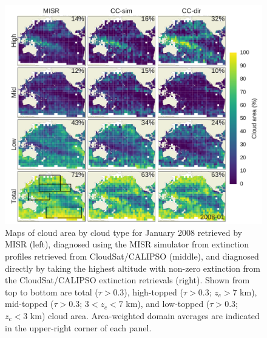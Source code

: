 \begin{figure}[htbp]
\centering
\includegraphics{graphics/misr_cldmisr_maps_2008-01.pdf}
\caption{\label{fig:misr_cldmisr_maps_january}Maps of cloud area by
cloud type for January 2008 retrieved by MISR (left), diagnosed using
the MISR simulator from extinction profiles retrieved from
CloudSat/CALIPSO (middle), and diagnosed directly by taking the highest
altitude with non-zero extinction from the CloudSat/CALIPSO extinction
retrievals (right). Shown from top to bottom are total (\(\tau > 0.3\)),
high-topped (\(\tau > 0.3\); \(z_c > 7\) km), mid-topped
(\(\tau > 0.3\); \(3 < z_c < 7\) km), and low-topped (\(\tau > 0.3\);
\(z_c < 3\) km) cloud area. Area-weighted domain averages are indicated
in the upper-right corner of each
panel.}\label{fig:misrux5fcldmisrux5fmapsux5fjanuary}
\end{figure}

